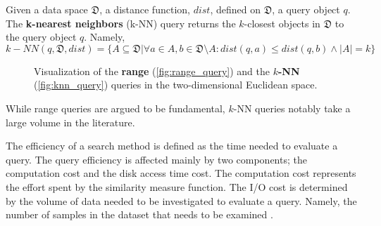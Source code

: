 \begin{definition}
Given a data space $\mathfrak{D}$, a distance function, $dist$, defined on $\mathfrak{D}$, a query object $q$. The \textbf{k-nearest neighbors} (k-NN) query returns the $k$-closest objects in $\mathfrak{D}$ to the query object $q$. Namely,
\begin{equation}
k-NN(q,\mathfrak{D},dist)=\{A \subseteq \mathfrak{D} | \forall a \in A, b \in \mathfrak{D} \setminus A: dist(q,a) \leq dist(q,b) \wedge |A|=k \}
\end{equation}
\label{def:knn_query} 
\end{definition}

\begin{figure}[h!]
	\centering
    \caption{Visualization of the \textbf{range} (\ref{fig:range_query}) and the \textbf{$k$-NN} (\ref{fig:knn_query}) queries in the two-dimensional Euclidean space.}
   \label{fig:similarity_query_types}
\end{figure}
While range queries are argued to be fundamental, $k$-NN queries notably take a large volume in the literature.

\iftoggle{edit-mode}{\hspace{0pt}\marginpar{Problems - similarity search costs}}{}
The efficiency of a search method is defined as the time needed to evaluate a query. 
The query efficiency is affected mainly by two components; the computation cost and the disk access time cost. 
The computation cost represents the effort spent by the similarity measure function. 
The I/O cost is determined by the volume of data needed to be investigated to evaluate a query. Namely, the number of samples in the dataset that needs to be examined \cite{saabni2013efficient}.

